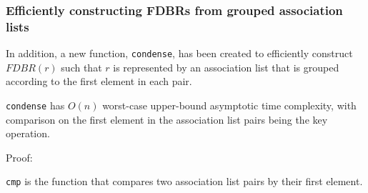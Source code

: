 \documentclass[../main.tex]{subfiles}
\begin{document}

\subsubsection{Efficiently constructing FDBRs from grouped association lists}
In addition, a new function, \texttt{condense}, has been created to efficiently construct $FDBR(r)$ such that $r$ is represented by an association list that is grouped according to the first element in each pair.


\begin{theorem}
	\texttt{condense} has $O(n)$ worst-case upper-bound asymptotic time complexity, with comparison on the first element in the association list pairs being the key operation.
\end{theorem}

Proof:

\texttt{cmp} is the function that compares two association list pairs by their first element.  






\end{document}
